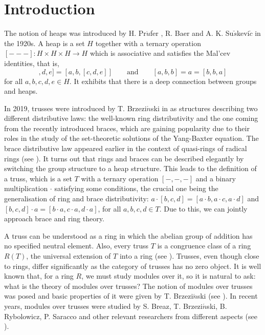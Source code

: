 \documentclass[11pt, twoside]{article}
\begin{document}
\pagestyle{myheadings}
%
\markboth{\rightline {\scriptsize }}
         {\leftline{\scriptsize  }}


 \medskip

\pagestyle{myheadings}
%
         {}




\section{Introduction}
The notion of heaps was introduced by H. Pr$\ddot{u}$fer \cite{hp}, R. Baer \cite{tb4} and A. K. Su$\check{s}$kevi$\check{c}$ \cite{aks} in the 1920s. A heap is a set $H$ together with a ternary operation
$[---]: H\times H\times H\rightarrow H$ which is associative and satisfies the Mal'cev identities, that is,
\begin{equation*}
[[a,b,c],d,e] = [a,b,[c,d,e]] \qquad \text{and} \qquad [a,b,b] = a = [b,b,a]
\end{equation*}
for all $a,b,c,d,e\in H$. It exhibits that there is a deep connection between groups and heaps.

In 2019, trusses were introduced by T. Brzezi$\acute{n}$ski in \cite{tb} as structures describing two different distributive laws: the well-known ring distributivity and the one coming from the recently introduced braces, which are gaining popularity due to their roles in the study of the set-theoretic solutions of the Yang-Baxter equation. The brace distributive law appeared earlier in the context of quasi-rings of radical rings (see \cite{ch}). It turns out that rings and braces can be described elegantly by switching the group structure to a heap structure. This leads to the definition of a truss, which is a set $T$ with a ternary operation $[-, -, -]$ and a binary multiplication $\cdot$ satisfying some conditions, the crucial one being the generalisation of ring and brace distributivity: $a\cdot [b, c, d] = [a\cdot b, a\cdot c, a\cdot d]$ and $[b, c, d]\cdot a = [b\cdot a, c\cdot a, d\cdot a]$, for all $a, b, c, d\in T$. Due to this, we can jointly approach brace and ring theory.

A truss can be understood as a ring in which the abelian group of addition has no specified neutral element. Also, every truss $T$ is a congruence class of a ring $R(T)$, the universal extension of $T$ into a ring (see \cite{tb1}). Trusses, even though close to rings, differ significantly as the category of trusses has no zero object. It is well known that, for a ring $R$, we must study modules over it, so it is natural to ask: what is the theory of modules over trusses? The notion of modules over trusses was posed and basic properties of it were given by T. Brzezi$\acute{n}$ski (see \cite{tb}). In recent years, modules over trusses were studied by S. Breaz, T. Brzezi$\acute{n}$ski, B. Rybolowicz, P. Saracco and other relevant researchers from different aspects (see \cite{stbp,mb,rtb,tb2,tbp,tb5,tb6}).
\end{document}

